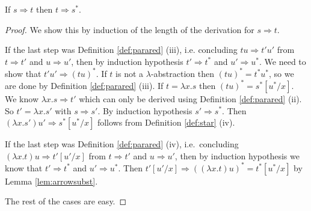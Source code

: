 \begin{boxlem} \label{lem:arrowstar}
    If $s \Rightarrow t$ then $t \Rightarrow s^*$.
\end{boxlem}
\begin{proof}
    We show this by induction of the length of the derivation for $s \Rightarrow t$.

    If the last step was Definition \ref{def:parared} (iii), i.e. concluding $tu \Rightarrow t'u'$ from $t \Rightarrow t'$ and $u \Rightarrow u'$, then by induction hypothesis $t' \Rightarrow t^*$ and $u' \Rightarrow u^*$.
    We need to show that $t'u' \Rightarrow (t u)^*$.
    If $t$ is not a $\lambda$-abstraction then $(tu)^* = t^*u^*$, so we are done by Definition \ref{def:parared} (iii).
    If $t = \lambda x. s$ then $(tu)^* = s^* [u^*/x]$.
    We know $\lambda x.s \Rightarrow t'$ which can only be derived using Definition \ref{def:parared} (ii).
    So $t' = \lambda x. s'$ with $s \Rightarrow s'$.
    By induction hypothesis $s' \Rightarrow s^*$.
    Then $(\lambda x. s') u' \Rightarrow s^* [u^*/x]$ follows from Definition \ref{def:star} (iv).

    If the last step was Definition \ref{def:parared} (iv), i.e.\ concluding $(\lambda x.t) u \Rightarrow t'[u'/x]$ from $t \Rightarrow t'$ and $u \Rightarrow u'$, then by induction hypothesis we know that $t' \Rightarrow t^*$ and $u' \Rightarrow u^*$.
    Then $t'[u'/x] \Rightarrow ((\lambda x.t)u)^* = t^*[u^* /x]$ by Lemma \ref{lem:arrowsubst}.

    The rest of the cases are easy.
\end{proof}

